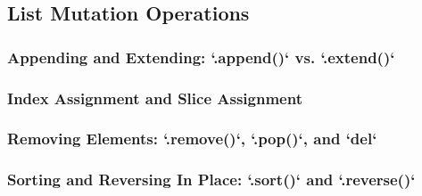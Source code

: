 \subsection{List Mutation Operations}
\subsubsection{Appending and Extending: `.append()` vs. `.extend()`}
\subsubsection{Index Assignment and Slice Assignment}
\subsubsection{Removing Elements: `.remove()`, `.pop()`, and `del`}
\subsubsection{Sorting and Reversing In Place: `.sort()` and `.reverse()`}
